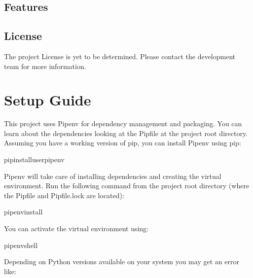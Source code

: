 \documentclass[letterpaper,10pt,english]{sphinxmanual}
\begin{document}
\section{Features}
\label{\detokenize{introduction:features}}

\section{License}
\label{\detokenize{introduction:license}}
\sphinxAtStartPar
The project License is yet to be determined. Please contact the development team for more information.

\sphinxstepscope


\chapter{Setup Guide}
\label{\detokenize{setup_guide:setup-guide}}\label{\detokenize{setup_guide::doc}}
\sphinxAtStartPar
This project uses Pipenv for dependency management and packaging. You can learn about the dependencies looking at the Pipfile at the project root directory. Assuming you have a working version of pip, you can install Pipenv using pip:

\begin{sphinxVerbatim}[commandchars=\\\{\}]
\PYGZdl{}pipinstall\PYGZhy{}\PYGZhy{}userpipenv
\end{sphinxVerbatim}

\sphinxAtStartPar
Pipenv will take care of installing dependencies and creating the virtual environment. Run the following command from the project root directory (where the Pipfile and Pipfile.lock are located):

\begin{sphinxVerbatim}[commandchars=\\\{\}]
\PYGZdl{}pipenvinstall
\end{sphinxVerbatim}

\sphinxAtStartPar
You can activate the virtual environment using:

\begin{sphinxVerbatim}[commandchars=\\\{\}]
\PYGZdl{}pipenvshell
\end{sphinxVerbatim}

\sphinxAtStartPar
Depending on Python versions available on your system you may get an error like:
\end{document}
